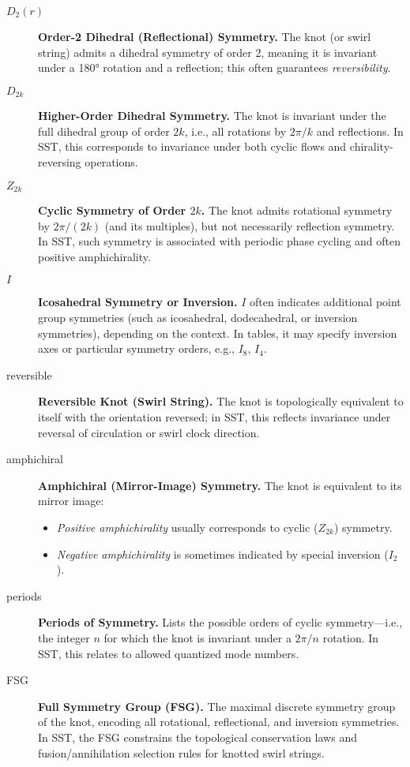 \documentclass{article}
\begin{document}
    \begin{description}
    \item[\( D_2(r) \)] \textbf{Order-2 Dihedral (Reflectional) Symmetry.}
    The knot (or swirl string) admits a dihedral symmetry of order 2, meaning it is invariant under a 180° rotation and a reflection; this often guarantees \emph{reversibility}.

    \item[\( D_{2k} \)] \textbf{Higher-Order Dihedral Symmetry.}
    The knot is invariant under the full dihedral group of order \( 2k \), i.e., all rotations by \( 2\pi/k \) and reflections. In SST, this corresponds to invariance under both cyclic flows and chirality-reversing operations.

    \item[\( Z_{2k} \)] \textbf{Cyclic Symmetry of Order \( 2k \).}
    The knot admits rotational symmetry by \( 2\pi/(2k) \) (and its multiples), but not necessarily reflection symmetry. In SST, such symmetry is associated with periodic phase cycling and often positive amphichirality.

    \item[\( I \)] \textbf{Icosahedral Symmetry or Inversion.}
    \( I \) often indicates additional point group symmetries (such as icosahedral, dodecahedral, or inversion symmetries), depending on the context. In tables, it may specify inversion axes or particular symmetry orders, e.g., \( I_8 \), \( I_4 \).

    \item[reversible] \textbf{Reversible Knot (Swirl String).}
    The knot is topologically equivalent to itself with the orientation reversed; in SST, this reflects invariance under reversal of circulation or swirl clock direction.

    \item[amphichiral] \textbf{Amphichiral (Mirror-Image) Symmetry.}
    The knot is equivalent to its mirror image:
    \begin{itemize}\item \emph{Positive amphichirality} usually corresponds to cyclic (\( Z_{2k} \)) symmetry.
    \item \emph{Negative amphichirality} is sometimes indicated by special inversion (\( I_2 \)).
    \end{itemize}

    \item[periods] \textbf{Periods of Symmetry.}
    Lists the possible orders of cyclic symmetry—i.e., the integer \( n \) for which the knot is invariant under a \( 2\pi/n \) rotation. In SST, this relates to allowed quantized mode numbers.

    \item[FSG] \textbf{Full Symmetry Group (FSG).}
    The maximal discrete symmetry group of the knot, encoding all rotational, reflectional, and inversion symmetries. In SST, the FSG constrains the topological conservation laws and fusion/annihilation selection rules for knotted swirl strings.
    \end{description}
\end{document}
